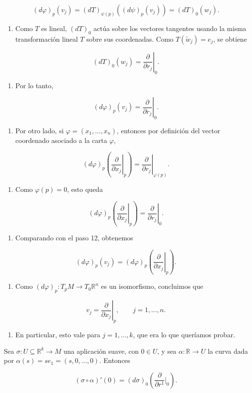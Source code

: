 \begin{bookproof}{}
\[
(d\varphi)_p(v_j)=(dT)_{\psi(p)}((d\psi)_p(v_j))=(dT)_0(w_j).
\]
\begin{enumerate}[start=11]
\item Como $T$ es lineal, $(dT)_0$ actúa sobre los vectores tangentes usando la misma transformación lineal $T$ sobre sus coordenadas. Como $T(\widetilde w_j)=e_j$, se obtiene
\end{enumerate}
\[
(dT)_0(w_j)=\left.\frac{\partial}{\partial r_j}\right|_0.
\]
\begin{enumerate}[start=12]
\item Por lo tanto,
\end{enumerate}
\[
(d\varphi)_p(v_j)=\left.\frac{\partial}{\partial r_j}\right|_0.
\]
\begin{enumerate}[start=13]
\item Por otro lado, si $\varphi=(x_1,\ldots,x_n)$, entonces por definición del vector coordenado asociado a la carta $\varphi$,
\end{enumerate}
\[
(d\varphi)_p\left(\left.\frac{\partial}{\partial x_j}\right|_p\right)=\left.\frac{\partial}{\partial r_j}\right|_{\varphi(p)}.
\]
\begin{enumerate}[start=14]
\item Como $\varphi(p)=0$, esto queda
\end{enumerate}
\[
(d\varphi)_p\left(\left.\frac{\partial}{\partial x_j}\right|_p\right)=\left.\frac{\partial}{\partial r_j}\right|_0.
\]
\begin{enumerate}[start=15]
\item Comparando con el paso 12, obtenemos
\end{enumerate}
\[
(d\varphi)_p(v_j)=(d\varphi)_p\left(\left.\frac{\partial}{\partial x_j}\right|_p\right).
\]
\begin{enumerate}[start=16]
\item Como $(d\varphi)_p:T_pM\to T_0\mathbb R^n$ es un isomorfismo, concluimos que
\end{enumerate}
\[
v_j=\left.\frac{\partial}{\partial x_j}\right|_p,\qquad j=1,\ldots,n.
\]
\begin{enumerate}[start=17]
\item En particular, esto vale para $j=1,\ldots,k$, que era lo que queríamos probar.
\end{enumerate}
\bookqed
\end{bookproof}
\label{blk:3071e3}
\begin{bookproposition}{}
Sea $\sigma:U\subseteq\mathbb R^k\to M$ una aplicación suave, con $0\in U$, y sea $\alpha:\mathbb R\to U$ la curva dada por $\alpha(s)=se_1=(s,0,\ldots,0)$. Entonces

\[
(\sigma\circ\alpha)'(0)=(d\sigma)_0\left(\frac{\partial}{\partial r^1}\big|_0\right).
\]
\end{bookproposition}
